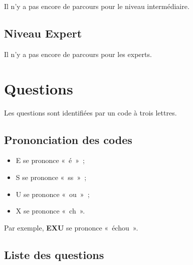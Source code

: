 \documentclass[11pt]{article}
\newcommand{\QST}[1]
{\textbf{#1}}
\begin{document}
Il n’y a pas encore de parcours pour le niveau intermédiaire.

\subsection{Niveau Expert}

Il n’y a pas encore de parcours pour les experts.

\section{Questions}

Les questions sont identifiées par un code à trois lettres.

\subsection{Prononciation des codes}

\begin{itemize}
    \item E se prononce « é » ;
    \item S se prononce « ss » ;
    \item U se prononce « ou » ;
    \item X se prononce « ch ».
\end{itemize}

Par exemple, \QST{EXU} se prononce « échou ».

\subsection{Liste des questions} \label{liste questions}
\end{document}

